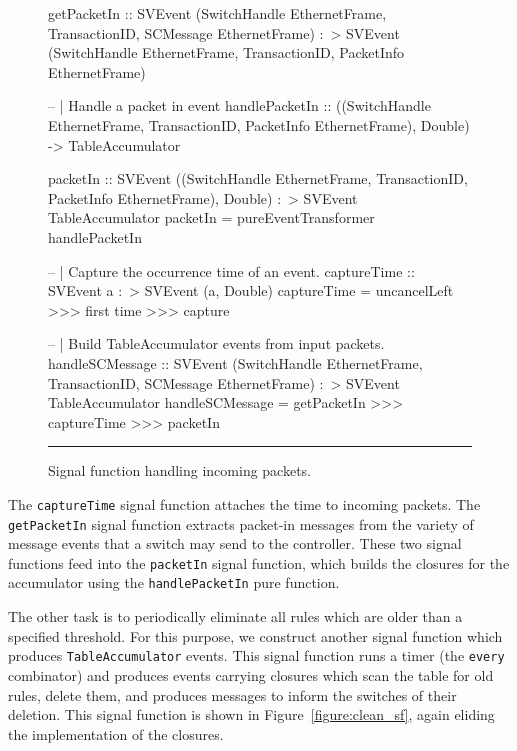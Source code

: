 \begin{figure}
\begin{code}
getPacketIn ::     SVEvent (SwitchHandle EthernetFrame,
                            TransactionID,
                            SCMessage EthernetFrame)
               :~> SVEvent (SwitchHandle EthernetFrame,
                            TransactionID,
                            PacketInfo EthernetFrame)

-- | Handle a packet in event
handlePacketIn ::    ((SwitchHandle EthernetFrame,
                       TransactionID,
                       PacketInfo EthernetFrame), Double)
                  -> TableAccumulator

packetIn ::     SVEvent ((SwitchHandle EthernetFrame,
                          TransactionID,
                          PacketInfo EthernetFrame),
                         Double)
            :~> SVEvent TableAccumulator
packetIn = pureEventTransformer handlePacketIn

-- | Capture the occurrence time of an event.
captureTime :: SVEvent a :~> SVEvent (a, Double)
captureTime = uncancelLeft >>>
              first time >>>
              capture

-- | Build TableAccumulator events from input packets.
handleSCMessage ::     SVEvent (SwitchHandle EthernetFrame,
                                TransactionID,
                                SCMessage EthernetFrame)
                   :~> SVEvent TableAccumulator
handleSCMessage = getPacketIn >>> captureTime >>> packetIn

\end{code}
\hrule
\caption{Signal function handling incoming packets.}
\label{figure:packet_in_sf}
\end{figure}

The {\tt captureTime} signal function attaches the time to incoming packets. The
{\tt getPacketIn} signal function extracts packet-in messages from the variety
of message events that a switch may send to the controller. These two signal
functions feed into the {\tt packetIn} signal function, which builds the
closures for the accumulator using the {\tt handlePacketIn} pure function.

The other task is to periodically eliminate all rules which are older than a
specified threshold. For this purpose, we construct another signal function
which produces {\tt TableAccumulator} events. This signal function runs a timer
(the {\tt every} combinator) and produces events carrying closures which scan
the table for old rules, delete them, and produces messages to inform the
switches of their deletion. This signal function is shown in Figure~\ref{figure:clean_sf},
again eliding the implementation of the closures.

